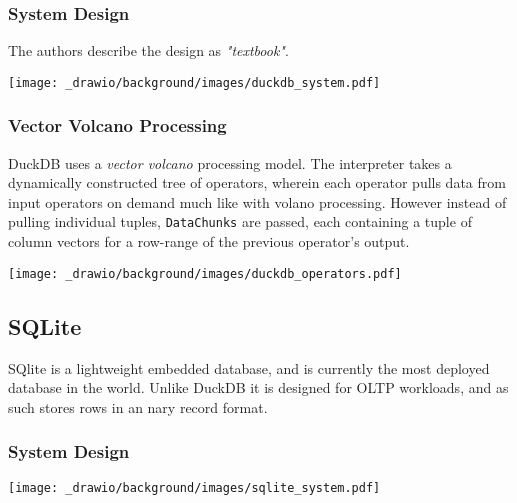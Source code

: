 \subsubsection{System Design}
The authors describe the design as \textit{"textbook"}\cite{DuckDBPaper}.
\begin{center}
    \texttt{[image: \_drawio/background/images/duckdb\_system.pdf]}
\end{center}
\subsubsection{Vector Volcano Processing}
DuckDB uses a \textit{vector volcano} processing model. The interpreter takes a dynamically constructed tree of operators, wherein each operator pulls data from input operators on demand much like with volano processing.
However instead of pulling individual tuples, \texttt{DataChunks} are passed, each containing a tuple of column vectors for a row-range of the previous operator's output.
\begin{center}
    \texttt{[image: \_drawio/background/images/duckdb\_operators.pdf]}
\end{center}


\subsection{SQLite}
SQlite is a lightweight embedded database\cite{SQLitePaper}, and is currently the most deployed database in the world\cite{SQLiteWebsite}.
Unlike DuckDB it is designed for OLTP workloads, and as such stores rows in an nary record format.
\subsubsection{System Design}
\begin{center}
    \texttt{[image: \_drawio/background/images/sqlite\_system.pdf]}
\end{center}
